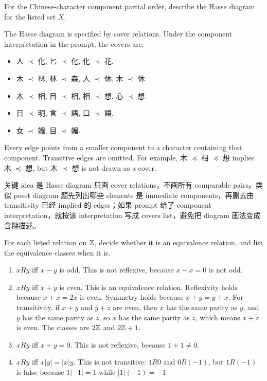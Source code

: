 \begin{exerciseblock}
For the Chinese-character component partial order, describe the Hasse diagram for the listed set \(X\).
\end{exerciseblock}

\begin{solution}
The Hasse diagram is specified by cover relations. Under the component interpretation in the prompt, the covers are:
\begin{itemize}
  \item 人 \(\prec\) 化, 匕 \(\prec\) 化, 化 \(\prec\) 花.
  \item 木 \(\prec\) 林, 林 \(\prec\) 森, 人 \(\prec\) 休, 木 \(\prec\) 休.
  \item 木 \(\prec\) 相, 目 \(\prec\) 相, 相 \(\prec\) 想, 心 \(\prec\) 想.
  \item 日 \(\prec\) 明, 言 \(\prec\) 語, 口 \(\prec\) 語.
  \item 女 \(\prec\) 媚, 目 \(\prec\) 媚.
\end{itemize}
Every edge points from a smaller component to a character containing that component. Transitive edges are omitted. For example, 木 \(\preceq\) 相 \(\preceq\) 想 implies 木 \(\preceq\) 想, but 木 \(\prec\) 想 is not drawn as a cover.
\end{solution}

\begin{explanation}
关键 idea 是 Hasse diagram 只画 cover relations，不画所有 comparable pairs。类似 poset diagram 题先列出哪些 elements 是 immediate components，再删去由 transitivity 已经 implied 的 edges；如果 prompt 给了 component interpretation，就按该 interpretation 写成 covers list，避免把 diagram 画法变成含糊描述。
\end{explanation}

\begin{exerciseblock}
For each listed relation on \(\mathbb{Z}\), decide whether it is an equivalence relation, and list the equivalence classes when it is.
\end{exerciseblock}

\begin{solution}
\begin{enumerate}[label=(\alph*)]
  \item \(xRy\) iff \(x-y\) is odd. This is not reflexive, because \(x-x=0\) is not odd.
  \item \(xRy\) iff \(x+y\) is even. This is an equivalence relation. Reflexivity holds because \(x+x=2x\) is even. Symmetry holds because \(x+y=y+x\). For transitivity, if \(x+y\) and \(y+z\) are even, then \(x\) has the same parity as \(y\), and \(y\) has the same parity as \(z\), so \(x\) has the same parity as \(z\), which means \(x+z\) is even. The classes are \(2\mathbb{Z}\) and \(2\mathbb{Z}+1\).
  \item \(xRy\) iff \(x+y=0\). This is not reflexive, because \(1+1\neq0\).
  \item \(xRy\) iff \(x|y|=|x|y\). This is not transitive: \(1R0\) and \(0R(-1)\), but \(1R(-1)\) is false because \(1|-1|=1\) while \(|1|(-1)=-1\).
\end{enumerate}
\end{solution}

